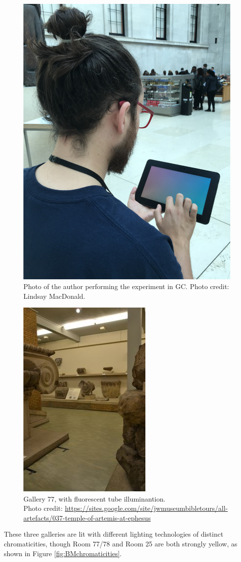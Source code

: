 \begin{figure}[hbtp]
\includegraphics[max width=\textwidth,max height=0.7\textwidth]{figs/tablet/BM_GC.jpg}
\caption{Photo of the author performing the experiment in GC. Photo credit: Lindsay MacDonald.}
\label{fig:BM_GC}
\end{figure}

\begin{figure}[hbtp]
\includegraphics[max width=\textwidth,max height=0.7\textwidth]{figs/tablet/BM77.jpg}
\caption{Gallery 77, with fluorescent tube illuminantion. \\ Photo credit: \url{https://sites.google.com/site/jwmuseumbibletours/all-artefacts/037-temple-of-artemis-at-ephesus}}
\label{fig:BM77}
\end{figure}

These three galleries are lit with different lighting technologies of distinct chromaticities, though Room 77/78 and Room 25 are both strongly yellow, as shown in Figure \ref{fig:BMchromaticities}.

